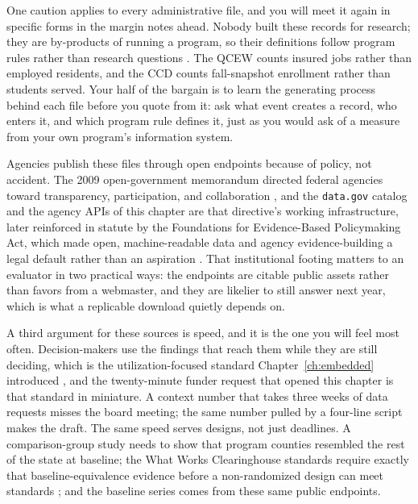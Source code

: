 \documentclass[
    a4paper,
    fontsize=10pt,
    twoside=true,
    numbers=noenddot,
]{kaobook}
\begin{document}
One caution applies to every administrative file, and you will meet it again in specific forms in the margin notes ahead. Nobody built these records for research; they are by-products of running a program, so their definitions follow program rules rather than research questions \parencite{connelly2016administrative}. The QCEW counts insured jobs rather than employed residents, and the CCD counts fall-snapshot enrollment rather than students served. Your half of the bargain is to learn the generating process behind each file before you quote from it: ask what event creates a record, who enters it, and which program rule defines it, just as you would ask of a measure from your own program's information system.

Agencies publish these files through open endpoints because of policy, not accident. The 2009 open-government memorandum directed federal agencies toward transparency, participation, and collaboration \parencite{obama2009transparency}, and the \texttt{data.gov} catalog and the agency APIs of this chapter are that directive's working infrastructure, later reinforced in statute by the Foundations for Evidence-Based Policymaking Act, which made open, machine-readable data and agency evidence-building a legal default rather than an aspiration \parencite{congress2019evidence}. That institutional footing matters to an evaluator in two practical ways: the endpoints are citable public assets rather than favors from a webmaster, and they are likelier to still answer next year, which is what a replicable download quietly depends on.

A third argument for these sources is speed, and it is the one you will feel most often. Decision-makers use the findings that reach them while they are still deciding, which is the utilization-focused standard Chapter~\ref{ch:embedded} introduced \parencite{patton2008utilization}, and the twenty-minute funder request that opened this chapter is that standard in miniature. A context number that takes three weeks of data requests misses the board meeting; the same number pulled by a four-line script makes the draft. The same speed serves designs, not just deadlines. A comparison-group study needs to show that program counties resembled the rest of the state at baseline; the What Works Clearinghouse standards require exactly that baseline-equivalence evidence before a non-randomized design can meet standards \parencite{wwc2022handbook}; and the baseline series comes from these same public endpoints.
\end{document}
